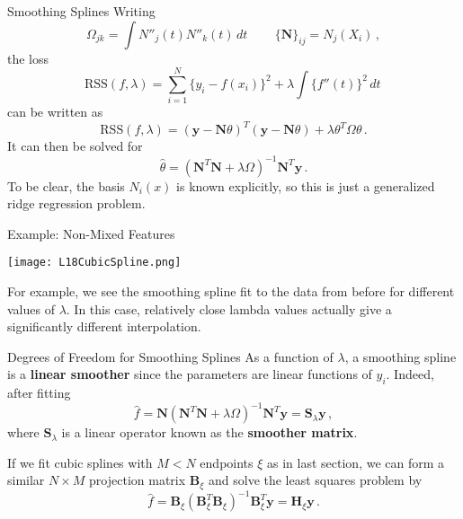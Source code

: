 \documentclass[10pt, table, dvipsnames,xcdraw,handout]{beamer}
\newcommand{\bfy}{\ensuremath{\mathbf{y}}}
\begin{document}
\begin{frame}[fragile]{Smoothing Splines}
Writing
$$
\Omega_{jk} = \int N''_j(t)N''_k(t)\,dt\,\hspace{2em} \{\mathbf{N}\}_{ij} = N_j(X_i)\,,
$$\pause
the loss
$$
\text{RSS}(f,\lambda) =\sum_{i=1}^N\{y_i - f(x_i)\}^2 + \lambda\int\{f''(t)\}^2\,dt\,
$$
can be written as
$$
\text{RSS}(f,\lambda) = (\bfy - \mathbf{N}\theta)^T(\bfy - \mathbf{N}\theta) + \lambda\theta^T\Omega\theta\,.
$$\pause
It can then be solved for
$$
\hat{\theta} = (\mathbf{N}^T\mathbf{N} + \lambda\Omega)^{-1}\mathbf{N}^T\bfy\,.
$$
To be clear, the basis $N_i(x)$ is known explicitly, so this is just a generalized ridge regression problem.
\end{frame}



\begin{frame}[fragile]{Example: Non-Mixed Features}
  \begin{minipage}[t][0.5\textheight][t]{\textwidth}
	\centering \texttt{[image: L18CubicSpline.png]} 
  \end{minipage}
  \vfill
\begin{minipage}[t][0.5\textheight][t]{\textwidth}
For example, we see the smoothing spline fit to the data from before for different values of $\lambda$. In this case, relatively close lambda values actually give a significantly different interpolation. 
\end{minipage}
\end{frame}




\begin{frame}[fragile]{Degrees of Freedom for Smoothing Splines}
As a function of $\lambda$, a smoothing spline is a \textbf{linear smoother} since the parameters are linear functions of $y_i$. \pause Indeed, after fitting
$$
\hat{f} = \mathbf{N}(\mathbf{N}^T\mathbf{N} + \lambda\Omega)^{-1}\mathbf{N}^T\bfy = \mathbf{S}_\lambda \bfy\,,
$$
where $\mathbf{S}_\lambda$ is a linear operator known as the \textbf{smoother matrix}.\pause

If we fit cubic splines with $M<N$ endpoints $\xi$ as in last section, we can form a similar $N\times M$ projection matrix $\mathbf{B}_\xi$ and solve the least squares problem by
$$
\hat{f} = \mathbf{B}_\xi(\mathbf{B}_\xi^T\mathbf{B}_\xi)^{-1}\mathbf{B}_\xi^T \mathbf{y} = \mathbf{H}_\xi \bfy\,.
$$
\end{frame}
\end{document}
